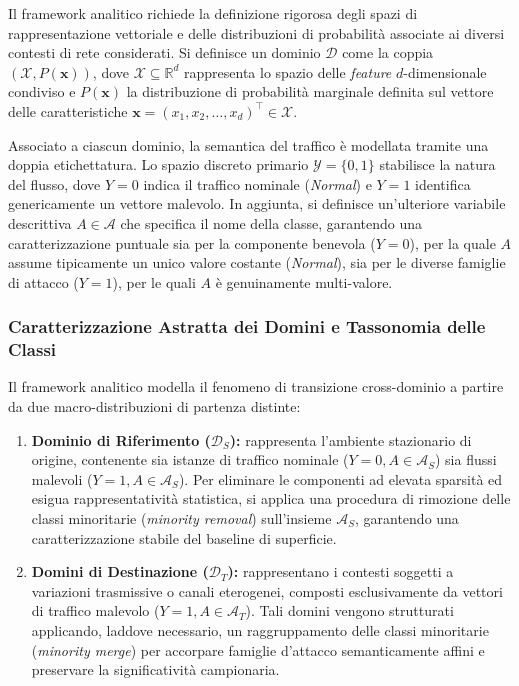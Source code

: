 Il framework analitico richiede la definizione rigorosa degli spazi di rappresentazione vettoriale e delle distribuzioni di probabilità associate ai diversi contesti di rete considerati. Si definisce un dominio $\mathcal{D}$ come la coppia $(\mathcal{X}, P(\mathbf{x}))$, dove $\mathcal{X} \subseteq \mathbb{R}^d$ rappresenta lo spazio delle \textit{feature} $d$-dimensionale condiviso e $P(\mathbf{x})$ la distribuzione di probabilità marginale definita sul vettore delle caratteristiche $\mathbf{x} = (x_1, x_2, \dots, x_d)^\top \in \mathcal{X}$.

Associato a ciascun dominio, la semantica del traffico è modellata tramite una doppia etichettatura. Lo spazio discreto primario $\mathcal{Y} = \{0,1\}$ stabilisce la natura del flusso, dove $Y = 0$ indica il traffico nominale (\textit{Normal}) e $Y = 1$ identifica genericamente un vettore malevolo. In aggiunta, si definisce un'ulteriore variabile descrittiva $A \in \mathcal{A}$ che specifica il nome della classe, garantendo una caratterizzazione puntuale sia per la componente benevola ($Y = 0$), per la quale $A$ assume tipicamente un unico valore costante (\textit{Normal}), sia per le diverse famiglie di attacco ($Y = 1$), per le quali $A$ è genuinamente multi-valore.

\subsubsection{Caratterizzazione Astratta dei Domini e Tassonomia delle Classi}
\label{subsubsec:caratterizzazione_domini}
Il framework analitico modella il fenomeno di transizione cross-dominio a partire da due macro-distribuzioni di partenza distinte:
\begin{enumerate}
    \item \textbf{Dominio di Riferimento ($\mathcal{D}_S$):} rappresenta l'ambiente stazionario di origine, contenente sia istanze di traffico nominale ($Y = 0, A \in \mathcal{A}_S$) sia flussi malevoli ($Y = 1, A \in \mathcal{A}_S$). Per eliminare le componenti ad elevata sparsità ed esigua rappresentatività statistica, si applica una procedura di rimozione delle classi minoritarie (\textit{minority removal}) sull'insieme $\mathcal{A}_S$, garantendo una caratterizzazione stabile del baseline di superficie.
    \item \textbf{Domini di Destinazione ($\mathcal{D}_T$):} rappresentano i contesti soggetti a variazioni trasmissive o canali eterogenei, composti esclusivamente da vettori di traffico malevolo ($Y = 1, A \in \mathcal{A}_T$). Tali domini vengono strutturati applicando, laddove necessario, un raggruppamento delle classi minoritarie (\textit{minority merge}) per accorpare famiglie d'attacco semanticamente affini e preservare la significatività campionaria.
\end{enumerate}

